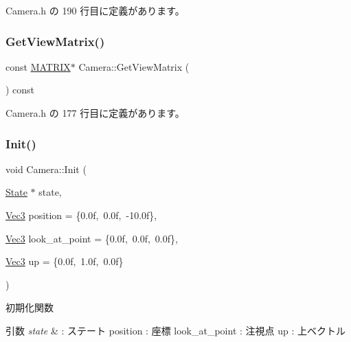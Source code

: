  Camera.\+h の 190 行目に定義があります。

\mbox{\label{class_camera_aa472374f61480c5a9dff89d30be029f4}} 
\subsubsection{\texorpdfstring{Get\+View\+Matrix()}{GetViewMatrix()}}
{\footnotesize\ttfamily const \mbox{\hyperlink{_vector3_d_8h_a032295cd9fb1b711757c90667278e744}{M\+A\+T\+R\+IX}}$\ast$ Camera\+::\+Get\+View\+Matrix (\begin{DoxyParamCaption}{ }\end{DoxyParamCaption}) const\hspace{0.3cm}{\ttfamily [inline]}}



 Camera.\+h の 177 行目に定義があります。

\mbox{\label{class_camera_a03e3ca8b70417632f7b1b581426ec66d}} 
\subsubsection{\texorpdfstring{Init()}{Init()}}
{\footnotesize\ttfamily void Camera\+::\+Init (\begin{DoxyParamCaption}\item[{\mbox{\hyperlink{class_camera_1_1_state}{State}} $\ast$}]{state,  }\item[{\mbox{\hyperlink{_vector3_d_8h_ab16f59e4393f29a01ec8b9bbbabbe65d}{Vec3}}}]{position = {\ttfamily \{0.0f,~0.0f,~-\/10.0f\}},  }\item[{\mbox{\hyperlink{_vector3_d_8h_ab16f59e4393f29a01ec8b9bbbabbe65d}{Vec3}}}]{look\+\_\+at\+\_\+point = {\ttfamily \{0.0f,~0.0f,~0.0f\}},  }\item[{\mbox{\hyperlink{_vector3_d_8h_ab16f59e4393f29a01ec8b9bbbabbe65d}{Vec3}}}]{up = {\ttfamily \{0.0f,~1.0f,~0.0f\}} }\end{DoxyParamCaption})}



初期化関数 


\begin{DoxyParams}{引数}
{\em state} & \+: ステート position \+: 座標 look\+\_\+at\+\_\+point \+: 注視点 up \+: 上ベクトル \\
\hline
\end{DoxyParams}


